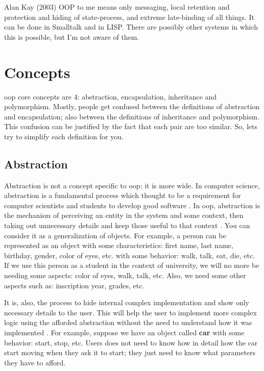 \documentclass[12pt]{book}
\begin{document}
\begin{kodequote}{Alan Kay (2003)}
	OOP to me means only messaging, local retention and protection and hiding of state-process, and extreme late-binding of all things. 
	It can be done in Smalltalk and in LISP. 
	There are possibly other systems in which this is possible, but I'm not aware of them.
\end{kodequote}




\section{Concepts}

\ac{oop} core concepts are 4: abstraction, encapsulation, inheritance and polymorphism. 
Mostly, people get confused between the definitions of abstraction and encapsulation; also between the definitions of inheritance and polymorphism. 
This confusion can be justified by the fact that each pair are too similar. 
So, lets try to simplify each definition for you.

\subsection{Abstraction}

Abstraction is not a concept specific to \ac{oop}; it is more wide. 
In computer science, abstraction is a fundamental process which thought to be a requirement for computer scientists and students to develop good software \citep{2013-saitta-zucker}.
In \ac{oop}, abstraction is the mechanism of perceiving an entity in the system and some context, then taking out unnecessary details and keep those useful to that context \citep{2014-rahman}.
You can consider it as a generalization of objects.
For example, a person can be represented as an object with some characteristics: first name, last name, birthday, gender, color of eyes, etc. with some behavior: walk, talk, eat, die, etc. 
If we use this person as a student in the context of university, we will no more be needing some aspects: color of eyes, walk, talk, etc. 
Also, we need some other aspects such as: inscription year, grades, etc. 

It is, also, the process to hide internal complex implementation and show only necessary details to the user. 
This will help the user to implement more complex logic using the afforded abstraction without the need to understand how it was implemented \citep{2017-janssen}.
For example, suppose we have an object called \textbf{car} with some behavior: start, stop, etc. 
Users does not need to know how in detail how the car start moving when they ask it to start; they just need to know what parameters they have to afford.
\end{document}
